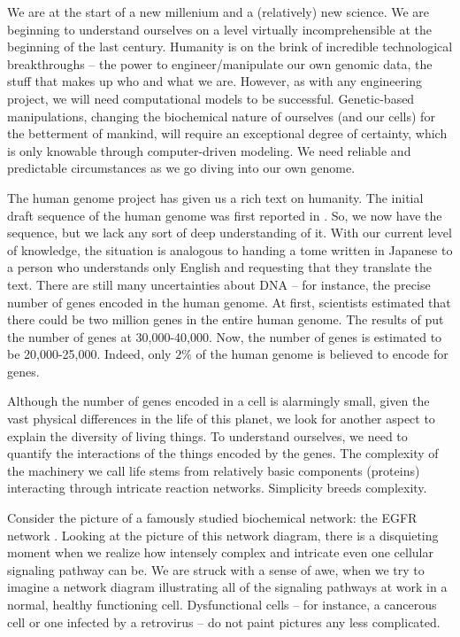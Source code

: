 \documentclass[copyright]{eptcs}
\begin{document}
We are at the start of a new millenium and a (relatively) new science.  We are beginning to understand ourselves on a level virtually incomprehensible at the beginning of the last century.  Humanity is on the brink of incredible technological breakthroughs -- the power to engineer/manipulate our own genomic data, the stuff that makes up who and what we are.  However, as with any engineering project, we will need computational models to be successful.  Genetic-based manipulations, changing the biochemical nature of ourselves (and our cells) for the betterment of mankind, will require an exceptional degree of certainty, which is only knowable through computer-driven modeling.  We need reliable and predictable circumstances as we go diving into our own genome.

The human genome project has given us a rich text on humanity.  The initial draft sequence of the human genome was first reported in \cite{hgp}.  So, we now have the sequence, but we lack any sort of deep understanding of it.  With our current level of knowledge, the situation is analogous to handing a tome written in Japanese to a person who understands only English and requesting that they translate the text.  There are still many uncertainties about DNA -- for instance, the precise number of genes encoded in the human genome. At first, scientists estimated that there could be two million genes in the entire human genome.  The results of \cite{hgp} put the number of genes at 30,000-40,000.  Now, the number of genes is estimated to be 20,000-25,000.  Indeed, only $2\%$ of the human genome is believed to encode for genes.




Although the number of genes encoded in a cell is alarmingly small, given the vast physical differences in the life of this planet, we look for another aspect to explain the diversity of living things.  To understand ourselves, we need to quantify the interactions of the things encoded by the genes.  The complexity of the machinery we call life stems from relatively basic components (proteins) interacting through intricate reaction networks.  Simplicity breeds complexity.

Consider the picture of a famously studied biochemical network: the EGFR network \cite{oda05}.  Looking at the picture of this network diagram, there is a disquieting moment when we realize how intensely complex and intricate even one cellular signaling pathway can be.  We are struck with a sense of awe, when we try to imagine a network diagram illustrating all of the signaling pathways at work in a normal, healthy functioning cell.  Dysfunctional cells -- for instance, a cancerous cell or one infected by a retrovirus -- do not paint pictures any less complicated.
\end{document}
